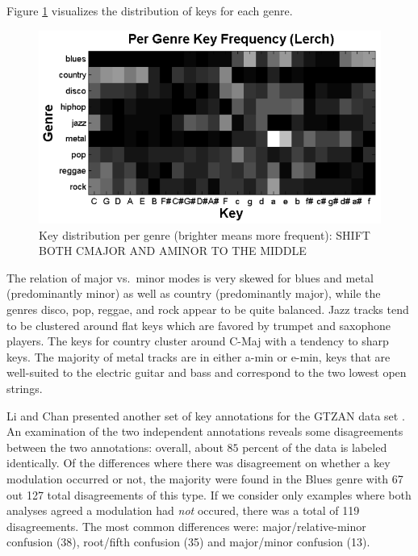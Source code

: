 \documentclass{article}
\begin{document}
Figure \ref{fig:KeyDistributionPerGenre} visualizes the distribution of keys for each genre.
\begin{figure}
    \includegraphics[scale=.4]{graph/key_distribution}
	\caption{Key distribution per genre (brighter means more frequent): SHIFT BOTH CMAJOR AND AMINOR TO THE MIDDLE}
	\label{fig:KeyDistributionPerGenre}
\end{figure}
The relation of major vs.\ minor modes is very skewed for blues and metal (predominantly minor) as well as country (predominantly major), while the genres disco, pop, reggae, and rock appear to be quite balanced.
Jazz tracks tend to be clustered around flat keys which are favored by trumpet and saxophone players. 
The keys for country cluster around C-Maj with a tendency to sharp keys.
The majority of metal tracks are in either a-min or e-min, keys that are well-suited to the electric guitar and bass and correspond to the two lowest open strings.


Li and Chan presented another set of key annotations for the GTZAN data set \cite{li_genre_2011}. An examination of the two independent annotations reveals some disagreements between the two annotations: overall, about $85$ percent of the data is labeled identically. Of the differences where there was disagreement on whether a key modulation occurred or not, the majority were found in the Blues genre with 67 out 127 total disagreements of this type. If we consider only examples where both analyses agreed a modulation had \textit{not} occured, there was a total of 119 disagreements. The most common differences were: major/relative-minor confusion (38), root/fifth confusion (35) and major/minor confusion (13).
\end{document}
